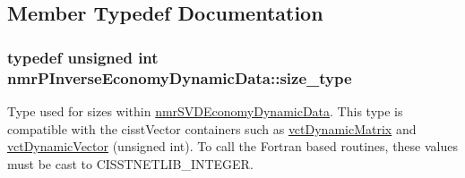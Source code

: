 \subsection{Member Typedef Documentation}
\hypertarget{classnmr_p_inverse_economy_dynamic_data_a32ab8d601abf927292b49d0cea124f9b}{
\subsubsection[{size\-\_\-type}]{\setlength{\rightskip}{0pt plus 5cm}typedef unsigned int {\bf nmr\-P\-Inverse\-Economy\-Dynamic\-Data\-::size\-\_\-type}}}\label{classnmr_p_inverse_economy_dynamic_data_a32ab8d601abf927292b49d0cea124f9b}
Type used for sizes within \hyperlink{classnmr_s_v_d_economy_dynamic_data}{nmr\-S\-V\-D\-Economy\-Dynamic\-Data}. This type is compatible with the cisst\-Vector containers such as \hyperlink{classvct_dynamic_matrix}{vct\-Dynamic\-Matrix} and \hyperlink{classvct_dynamic_vector}{vct\-Dynamic\-Vector} (unsigned int). To call the Fortran based routines, these values must be cast to C\-I\-S\-S\-T\-N\-E\-T\-L\-I\-B\-\_\-\-I\-N\-T\-E\-G\-E\-R. 

